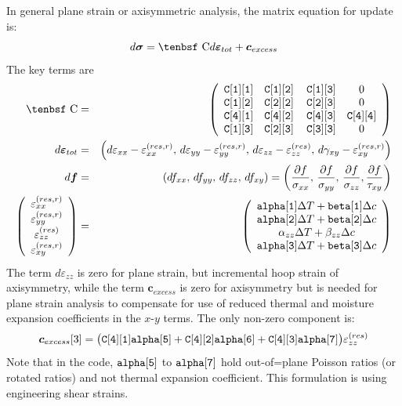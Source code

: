 \documentclass[11pt]{article}
\renewcommand{\vec}[1]{\boldsymbol{#1}}
\def\a#1{\alpha_{#1}}
\def\b#1{\beta_{#1}}
\def\C{\hbox{\tenbsf C}}
\def\cex{\vec{c}_{excess}}
\def\code#1{{\small\tt #1}}
\def\deff{d \vec{\varepsilon}_{tot}}
\def\df{d \vec{f}}
\def\dsig{d \vec{\sigma}}
\def\DT{\Delta T}
\def\e#1{\varepsilon_{#1}}
\def\er#1{\varepsilon_{#1}^{(res)}}
\def\err#1{\varepsilon_{#1}^{(res,r)}}
\def\g#1{\gamma_{#1}}
\begin{document}
In general plane strain or axisymmetric analysis, the matrix equation for update is:
\begin{equation}
    \dsig = \C \deff +\cex
\end{equation}
The key terms are
\begin{eqnarray}
      \C & = & \left(\begin{array}{cccc} \code{C[1][1]}  & \code{C[1][2]}  & \thinspace\code{C[1][3]}  & 0   \\
                    \code{C[1][2]}  & \code{C[2][2]}  & \thinspace\code{C[2][3]}  & 0 \\
                            \code{C[4][1]}  & \code{C[4][2]}  & \thinspace\code{C[4][3]}  & \code{C[4][4]}  \\
                 \code{C[1][3]}  & \code{C[2][3]}  & \thinspace\code{C[3][3]}  & 0 \end{array}\right)  \\
      \deff & = & \left(d\e{xx} - \err{xx}, \thinspace d\e{yy} - \err{yy}, \thinspace d\e{zz} -  \er{zz}, 
              \thinspace d\g{xy}-\err{xy}\right) \\
      \df & = & (df_{xx}, \thinspace df_{yy}, \thinspace df_{zz}, \thinspace df_{xy})
                  = \left({\partial f\over \sigma_{xx}}, \thinspace {\partial f\over \sigma_{yy}}, \thinspace {\partial f\over \sigma_{zz}},
                                {\partial f\over \tau_{xy}}\right)  \\
\left(\begin{array}{c} \err{xx} \\ \err{yy} \\ \er{zz} \\ \err{xy} \end{array}\right)
       & = &  \left(\begin{array}{c}
	\code{alpha[1]}\DT + \code{beta[1]}\Delta c \\
	\code{alpha[2]}\DT + \code{beta[2]}\Delta c \\
	\a{zz}\DT + \b{zz}\Delta c \\
	\code{alpha[3]}\DT + \code{beta[3]}\Delta c  \end{array}\right) 
 \end{eqnarray}
The term $d\e{zz}$ is zero for plane strain, but incremental hoop strain of axisymmetry, while the term $\cex$ is zero for axisymmetry but is needed for plane strain analysis to compensate for use of reduced thermal and moisture expansion coefficients in the $x$-$y$ terms. The only non-zero component is:
\begin{equation}
      \cex[3] = \bigl(\code{C[4][1]}\code{alpha[5]}
              + \code{C[4][2]}\code{alpha[6]}+\code{C[4][3]}\code{alpha[7]}\bigr)\er{zz} 
\end{equation}
Note that in the code, $\code{alpha[5]}$ to $\code{alpha[7]}$ hold out-of=plane Poisson ratios (or rotated ratios) and not thermal expansion coefficient.
This formulation is using engineering shear strains. 
 
\end{document}
